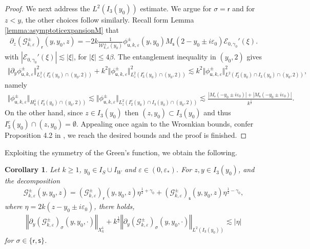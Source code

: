\documentclass[11pt,reqno]{amsproc}
\newtheorem{corollary}[proposition]{Corollary}
\theoremstyle{definition}
\numberwithin{equation}{section}
\newcommand{\G}{{\mathcal{G}}}
\newcommand{\sr}{{\mathsf{r}}}
\newcommand{\s}{{\mathsf{s}}}
\newcommand{\su}{{\mathsf{u}}}
\newcommand{\W}{{\mathcal{W}}}
\newcommand{\ep}{\varepsilon}
\newcommand{\p}{\partial}
\begin{document}
\begin{proof}
We next address the $L^2(I_3(y_0))$ estimate. We argue for $\sigma = \sr$ and for $z<y$, the other choices follow similarly. Recall form Lemma \ref{lemma:asymptoticexpansionM} that
\begin{align*}
\partial_z \left( \G_{k,\ep}^\pm\right)_\sr(y,y_0,z) = -2k\frac{1}{\W_{k,\ep}^\pm(y_0)}\phi_{\su,k,\ep}^\pm(y,y_0)M_\s(2 - y_0 \pm i\ep_0) \mathcal{E}_{0,\gamma_0}'(\xi).
\end{align*}
with $\left| \mathcal{E}_{0,\gamma_0}'(\xi) \right| \lesssim |\xi|$, for $|\xi|\leq 4\beta$.
The entanglement inequality in $(y_0,2)$ gives
\begin{align*}
\Vert \p_y\phi_{\su,k,\ep}^\pm \Vert_{L^2_z(I_3^c(y_0)\cap (y_0,2))}^2 + k^2 \Vert \phi_{\su,k,\ep}^\pm \Vert_{L^2_z(I_3^c(y_0)\cap (y_0,2))}^2 \lesssim k^2 \Vert \phi_{\su,k,\ep}^\pm \Vert_{L^2(I_2^c(y_0)\cap I_3(y_0)\cap (y_0,2))}^2,
\end{align*}
namely
\begin{align*}
\Vert \phi_{\su,k,\ep}^\pm \Vert_{H^1_k(I_3^c(y_0)\cap (y_0,2))} \lesssim \Vert \phi_{\su,k,\ep}^\pm \Vert_{L^2_z(I_2^c(y_0)\cap I_3(y_0)\cap (y_0,2))} \lesssim \frac{|M_\sr(-y_0 \pm i\ep_0)| + |M_\s( - y_0\pm i\ep_0)|}{k^\frac12}.
\end{align*}
On the other hand, since $z\in I_3(y_0)$ then $(z,y_0)\subset I_3(y_0)$ and thus $I_3^c(y_0)\cap (z,y_0) = \emptyset$. Appealing once again to the Wrosnkian bounds, confer Proposition 4.2 in \cite{CZN25chan}, we reach
the desired bounds and the proof is finished.
\end{proof}

Exploiting the symmetry of the Green's function, we obtain the following.
\begin{corollary}\label{cor:sobolevregpartialdecomG}
Let $k\geq 1$, $y_0\in I_S\cup I_W$ and $\ep\in (0,\ep_*)$. For $z,y\in I_3(y_0)$, and the decomposition
\begin{align*}
\G_{k,\ep}^\pm(y,y_0,z) = \left( \G_{k,\ep}^\pm\right)_\sr(y,y_0,z) \eta^{\frac12 + \gamma_0} + \left( \G_{k,\ep}^\pm\right)_\s(y,y_0,z) \eta^{\frac12 - \gamma_0},
\end{align*}
where $\eta=2k(z-y_0\pm i\ep_0)$, there holds, 
\begin{align*}
\left\Vert \partial_y\left( \G_{k,\ep}^\pm\right)_\sigma(y,y_0,\cdot) \right\Vert_{X_k^1} + k^\frac12 \left\Vert \partial_y\left( \G_{k,\ep}^\pm \right)_\sigma(y,y_0,\cdot) \right \Vert_{L^2(I_3(y_0))}\lesssim |\eta|
\end{align*}
for $\sigma\in \lbrace \sr, \s \rbrace$.
\end{corollary}
\end{document}

